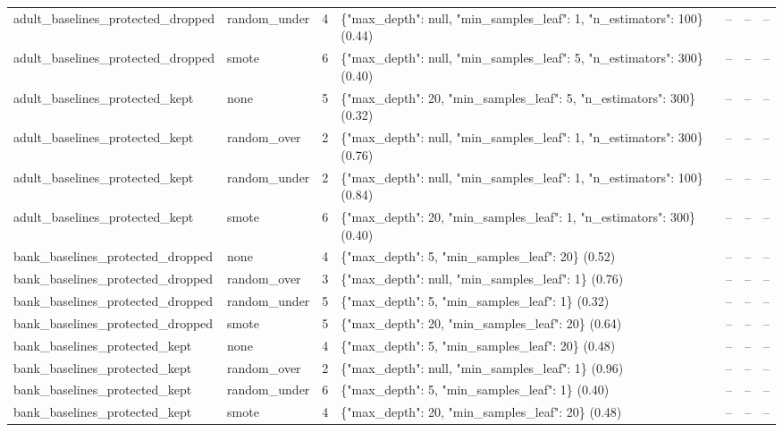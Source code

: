 \begin{table}[t]
{\begin{tabular}{llrp{6cm}rrr}
adult\_baselines\_protected\_dropped & random\_under & 4 & \{"max\_depth": null, "min\_samples\_leaf": 1, "n\_estimators": 100\} (0.44) & -- & -- & -- \\
adult\_baselines\_protected\_dropped & smote & 6 & \{"max\_depth": null, "min\_samples\_leaf": 5, "n\_estimators": 300\} (0.40) & -- & -- & -- \\
adult\_baselines\_protected\_kept & none & 5 & \{"max\_depth": 20, "min\_samples\_leaf": 5, "n\_estimators": 300\} (0.32) & -- & -- & -- \\
adult\_baselines\_protected\_kept & random\_over & 2 & \{"max\_depth": null, "min\_samples\_leaf": 1, "n\_estimators": 300\} (0.76) & -- & -- & -- \\
adult\_baselines\_protected\_kept & random\_under & 2 & \{"max\_depth": null, "min\_samples\_leaf": 1, "n\_estimators": 100\} (0.84) & -- & -- & -- \\
adult\_baselines\_protected\_kept & smote & 6 & \{"max\_depth": 20, "min\_samples\_leaf": 1, "n\_estimators": 300\} (0.40) & -- & -- & -- \\
bank\_baselines\_protected\_dropped & none & 4 & \{"max\_depth": 5, "min\_samples\_leaf": 20\} (0.52) & -- & -- & -- \\
bank\_baselines\_protected\_dropped & random\_over & 3 & \{"max\_depth": null, "min\_samples\_leaf": 1\} (0.76) & -- & -- & -- \\
bank\_baselines\_protected\_dropped & random\_under & 5 & \{"max\_depth": 5, "min\_samples\_leaf": 1\} (0.32) & -- & -- & -- \\
bank\_baselines\_protected\_dropped & smote & 5 & \{"max\_depth": 20, "min\_samples\_leaf": 20\} (0.64) & -- & -- & -- \\
bank\_baselines\_protected\_kept & none & 4 & \{"max\_depth": 5, "min\_samples\_leaf": 20\} (0.48) & -- & -- & -- \\
bank\_baselines\_protected\_kept & random\_over & 2 & \{"max\_depth": null, "min\_samples\_leaf": 1\} (0.96) & -- & -- & -- \\
bank\_baselines\_protected\_kept & random\_under & 6 & \{"max\_depth": 5, "min\_samples\_leaf": 1\} (0.40) & -- & -- & -- \\
bank\_baselines\_protected\_kept & smote & 4 & \{"max\_depth": 20, "min\_samples\_leaf": 20\} (0.48) & -- & -- & -- \\
\bottomrule
\end{tabular}}
\end{table}
